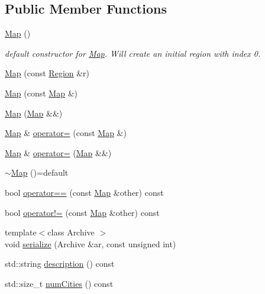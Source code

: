 \subsection*{Public Member Functions}
\begin{DoxyCompactItemize}
\item 
\hyperlink{classpan_1_1_map_a11ad1a3ad71e540b3f0c99f345e03e48}{Map} ()
\begin{DoxyCompactList}\small\item\em default constructor for \hyperlink{classpan_1_1_map}{Map}. Will create an initial region with index 0. \end{DoxyCompactList}\item 
\hyperlink{classpan_1_1_map_a60ce8e428c334ae75778774a46459128}{Map} (const \hyperlink{classpan_1_1_region}{Region} \&r)
\item 
\hyperlink{classpan_1_1_map_afe804f21ecea59695d8baabfb562026a}{Map} (const \hyperlink{classpan_1_1_map}{Map} \&)
\item 
\hyperlink{classpan_1_1_map_ac3348e336efab6436758eaa28c04db1a}{Map} (\hyperlink{classpan_1_1_map}{Map} \&\&)
\item 
\hyperlink{classpan_1_1_map}{Map} \& \hyperlink{classpan_1_1_map_af9d36a347d38a376d5da72bf85e95f68}{operator=} (const \hyperlink{classpan_1_1_map}{Map} \&)
\item 
\hyperlink{classpan_1_1_map}{Map} \& \hyperlink{classpan_1_1_map_a3413513964774303b47161eb8ed922f8}{operator=} (\hyperlink{classpan_1_1_map}{Map} \&\&)
\item 
\hyperlink{classpan_1_1_map_a91d7bff34d75bc416ec7e6bdc4a497ab}{$\sim$\+Map} ()=default
\item 
bool \hyperlink{classpan_1_1_map_a7b06691976776c099e60890b15b4eb99}{operator==} (const \hyperlink{classpan_1_1_map}{Map} \&other) const
\item 
bool \hyperlink{classpan_1_1_map_a7f5b4f8589dd3a4951e35d198b4f8048}{operator!=} (const \hyperlink{classpan_1_1_map}{Map} \&other) const
\item 
{\footnotesize template$<$class Archive $>$ }\\void \hyperlink{classpan_1_1_map_a0afa3368bc2f5fbd85b4b2c3205f0996}{serialize} (Archive \&ar, const unsigned int)
\item 
std\+::string \hyperlink{classpan_1_1_map_a9d08be170f445bbef11ea0d38ba8c531}{description} () const
\item 
std\+::size\+\_\+t \hyperlink{classpan_1_1_map_aa39642daa76646a3229fd5f92572b242}{num\+Cities} () const
\item 

\end{DoxyCompactItemize}
